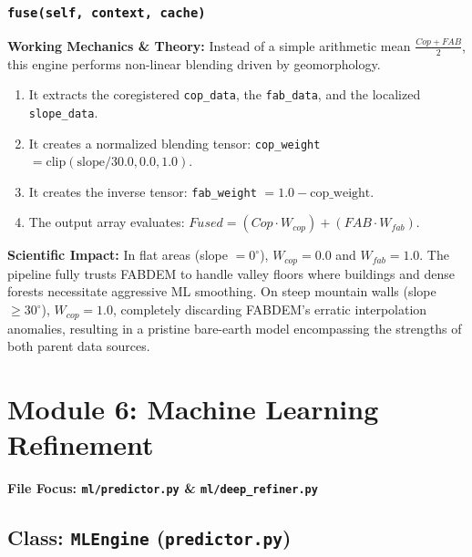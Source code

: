 \documentclass[11pt,a4paper,oneside]{report}
\begin{document}
\subsection{\texttt{fuse(self, context, cache)}}
\textbf{Working Mechanics \& Theory:}
Instead of a simple arithmetic mean $\frac{Cop + FAB}{2}$, this engine performs non-linear blending driven by geomorphology.
\begin{enumerate}
    \item It extracts the coregistered \texttt{cop\_data}, the \texttt{fab\_data}, and the localized \texttt{slope\_data}.
    \item It creates a normalized blending tensor: \texttt{cop\_weight} $= \text{clip}(\text{slope} / 30.0, 0.0, 1.0)$.
    \item It creates the inverse tensor: \texttt{fab\_weight} $= 1.0 - \text{cop\_weight}$.
    \item The output array evaluates: $Fused = (Cop \cdot W_{cop}) + (FAB \cdot W_{fab})$.
\end{enumerate}
\textbf{Scientific Impact:} In flat areas (slope $= 0^\circ$), $W_{cop} = 0.0$ and $W_{fab} = 1.0$. The pipeline fully trusts FABDEM to handle valley floors where buildings and dense forests necessitate aggressive ML smoothing. On steep mountain walls (slope $\ge 30^\circ$), $W_{cop} = 1.0$, completely discarding FABDEM's erratic interpolation anomalies, resulting in a pristine bare-earth model encompassing the strengths of both parent data sources.

\chapter{Module 6: Machine Learning Refinement}
\textbf{File Focus: \texttt{ml/predictor.py} \& \texttt{ml/deep\_refiner.py}}

\section{Class: \texttt{MLEngine} (\texttt{predictor.py})}
\end{document}
